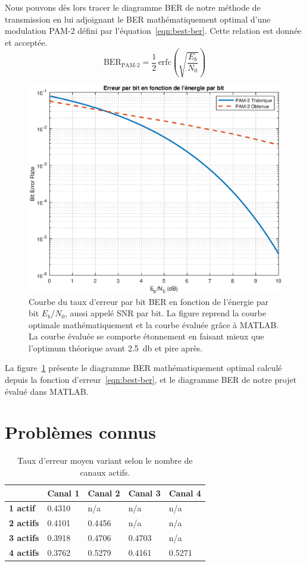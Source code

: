 \documentclass[10pt, oneside, a4paper]{article}
\begin{document}
Nous pouvons dès lors tracer le diagramme BER de notre méthode de transmission en lui adjoignant le BER mathématiquement optimal d'une modulation PAM-2 défini par l'équation~\ref{eqn:best-ber}. Cette relation est donnée et acceptée.
\begin{equation}
    \text{BER}_\text{PAM-2} = \frac{1}{2}\,\text{erfc}\left(\sqrt{\frac{E_b}{N_0}}\right)
    \label{eqn:best-ber}
\end{equation}
\begin{figure}[!ht]
    \centering
    \includegraphics[height=0.4\textheight]{eps/ber-curve.eps}
    \caption{Courbe du taux d'erreur par bit BER en fonction de l'énergie par bit
             $E_b/N_0$, aussi appelé SNR par bit.
             La figure reprend la courbe optimale mathématiquement et la courbe évaluée
             grâce à MATLAB. La courbe évaluée se comporte étonnement en faisant mieux
             que l'optimum théorique avant \SI{2.5}{\decibel} et pire après.}
    \label{fig:ber-curve}
\end{figure}
La figure~\ref{fig:ber-curve} présente le diagramme BER mathématiquement optimal calculé depuis la fonction d'erreur~\ref{eqn:best-ber}, et le diagramme BER de notre projet évalué dans MATLAB.

\section{Problèmes connus}

\begin{table}[!ht]
\centering
\begin{tabular}{l|llll}
& \bf Canal 1 & \bf Canal 2 & \bf Canal 3 & \bf Canal 4\\
\hline
\bf 1 actif  & 0.4310 & n/a    & n/a    & n/a\\
\bf 2 actifs & 0.4101 & 0.4456 & n/a    & n/a\\
\bf 3 actifs & 0.3918 & 0.4706 & 0.4703 & n/a\\
\bf 4 actifs & 0.3762 & 0.5279 & 0.4161 & 0.5271
\end{tabular}
\caption{Taux d'erreur moyen variant selon le nombre de canaux actifs.}
\end{table}
\end{document}
